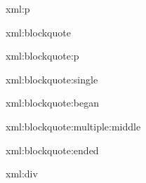 \startxmlsetups xml:p
  \startparagraph
  \stopparagraph
\stopxmlsetups

\startxmlsetups xml:blockquote
\stopxmlsetups

\startxmlsetups xml:blockquote:p
\stopxmlsetups

\startxmlsetups xml:blockquote:single
  \startquotation
  \stopquotation
\stopxmlsetups

\startxmlsetups xml:blockquote:began
  \startquotation
\stopxmlsetups

\startxmlsetups xml:blockquote:multiple:middle
    \par{}
\stopxmlsetups

\startxmlsetups xml:blockquote:ended
    \par{}
  \stopquotation
\stopxmlsetups

\startxmlsetups xml:div
  \stop
\stopxmlsetups

